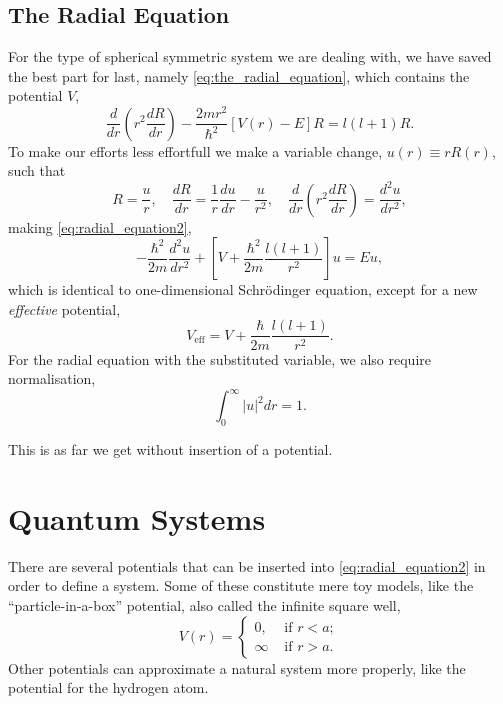 \subsection{The Radial Equation}

For the type of spherical symmetric system we are dealing with, we have 
saved the best part for last, namely \autoref{eq:the_radial_equation},
which contains the potential $V$,
\begin{equation}
    \label{eq:radial_equation2}
    \frac{d}{dr}\left(r^2\frac{dR}{dr} \right)
    -
    \frac{2mr^2}{\hbar^2} [V(r) - E]R
    =
    l(l + 1)R.
\end{equation}
To make our efforts less effortfull we make a variable change, $u(r) \equiv r R(r)$,
such that 
\begin{equation*}
    R = \frac{u}{r}, \quad
    \frac{dR}{dr} = \frac{1}{r}\frac{du}{dr} - \frac{u}{r^2}, \quad 
    \frac{d}{dr}\left(r^2 \frac{dR}{dr} \right)
        = \frac{d^2u}{dr^2},
\end{equation*}
making \autoref{eq:radial_equation2},
\begin{equation}
    - \frac{\hbar^2}{2m}\frac{d^2u}{dr^2}
    +
    \left[
        V + \frac{\hbar^2}{2m}\frac{l(l + 1)}{r^2} 
    \right]
    u = Eu,
\end{equation}
which is identical to one-dimensional Schrödinger equation, except for 
a new \emph{effective} potential,
\begin{equation}
    V_\text{eff} = V + \frac{\hbar}{2m}\frac{l(l + 1)}{r^2}.
\end{equation}
For the radial equation with the substituted variable, we also require normalisation,
\begin{equation} 
    \int_0^\infty |u|^2 dr = 1.
\end{equation}

This is as far we get without insertion of a potential. 

\section{Quantum Systems}

There are several potentials that can be inserted into \autoref{eq:radial_equation2}
in order to define a system. Some of these constitute mere toy models, like 
the ``particle-in-a-box'' potential, also called the infinite square well,
\begin{equation}
    V(r) = \begin{cases}
        0,      &\text{ if } r < a;\\
        \infty  &\text{ if } r > a.
    \end{cases} 
 \end{equation}
Other potentials can approximate a natural system more properly,
like the potential for the hydrogen atom.

